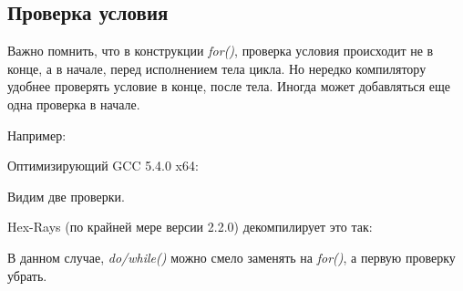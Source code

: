\subsection{Проверка условия}

Важно помнить, что в конструкции \emph{for()}, проверка условия происходит не в конце, а в начале, перед исполнением тела цикла.
Но нередко компилятору удобнее проверять условие в конце, после тела.
Иногда может добавляться еще одна проверка в начале.

Например:



Оптимизирующий GCC 5.4.0 x64:



Видим две проверки.

Hex-Rays (по крайней мере версии 2.2.0) декомпилирует это так:



В данном случае, \emph{do/while()} можно смело заменять на \emph{for()}, а первую проверку убрать.

